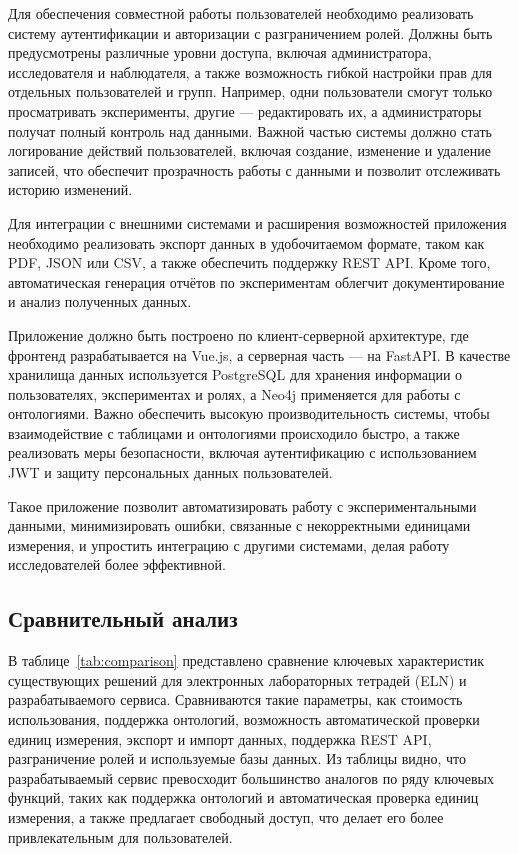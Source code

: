 Для обеспечения совместной работы пользователей необходимо реализовать систему аутентификации и авторизации с разграничением ролей. Должны быть предусмотрены различные уровни доступа, включая администратора, исследователя и наблюдателя, а также возможность гибкой настройки прав для отдельных пользователей и групп. Например, одни пользователи смогут только просматривать эксперименты, другие — редактировать их, а администраторы получат полный контроль над данными. Важной частью системы должно стать логирование действий пользователей, включая создание, изменение и удаление записей, что обеспечит прозрачность работы с данными и позволит отслеживать историю изменений.

Для интеграции с внешними системами и расширения возможностей приложения необходимо реализовать экспорт данных в удобочитаемом формате, таком как PDF, JSON или CSV, а также обеспечить поддержку REST API\cite{arch:REST}. Кроме того, автоматическая генерация отчётов по экспериментам облегчит документирование и анализ полученных данных.

Приложение должно быть построено по клиент-серверной архитектуре, где фронтенд разрабатывается на Vue.js\cite{Framework:VueJS}, а серверная часть — на FastAPI\cite{Framework:FastAPI}. В качестве хранилища данных используется PostgreSQL \cite{DB:PostgreSQL} для хранения информации о пользователях, экспериментах и ролях, а Neo4j применяется для работы с онтологиями. Важно обеспечить высокую производительность системы, чтобы взаимодействие с таблицами и онтологиями происходило быстро, а также реализовать меры безопасности, включая аутентификацию с использованием JWT\cite{Security:JWT} и защиту персональных данных пользователей.

Такое приложение позволит автоматизировать работу с экспериментальными данными, минимизировать ошибки, связанные с некорректными единицами измерения, и упростить интеграцию с другими системами, делая работу исследователей более эффективной.

\subsection{Сравнительный анализ}

В таблице~\ref{tab:comparison} представлено сравнение ключевых характеристик существующих решений для электронных лабораторных тетрадей (ELN) и разрабатываемого сервиса. Сравниваются такие параметры, как стоимость использования, поддержка онтологий, возможность автоматической проверки единиц измерения, экспорт и импорт данных, поддержка REST API, разграничение ролей и используемые базы данных. Из таблицы видно, что разрабатываемый сервис превосходит большинство аналогов по ряду ключевых функций, таких как поддержка онтологий и автоматическая проверка единиц измерения, а также предлагает свободный доступ, что делает его более привлекательным для пользователей.

